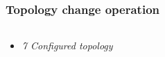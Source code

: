 \documentclass[10pt, blue,subsection=true, compress]{beamer}
\begin{document}
\subsection*{}
\begin{frame} \frametitle{Topology change operation }
 
\begin{columns}[t]
    \begin{block} {\begin{itemize} \item \textit{7 Configured topology} \end{itemize}}
   

\end{block}
\end{columns}
\end{frame}
\end{document}
